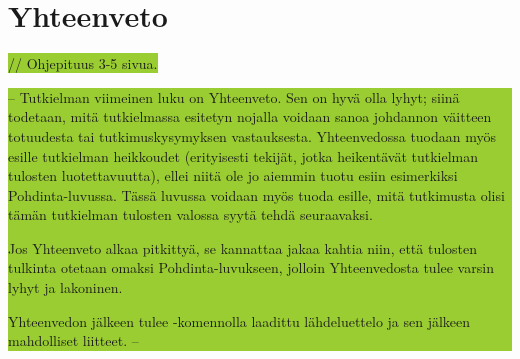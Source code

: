 \documentclass[utf8]{gradu3}
\begin{document}
\chapter{Yhteenveto}
\colorbox{YellowGreen}{// Ohjepituus 3-5 sivua.}

\colorbox{YellowGreen}{-- Tutkielman viimeinen luku on Yhteenveto.  Sen on hyvä olla lyhyt; siinä todetaan, mitä tutkielmassa esitetyn nojalla voidaan sanoa johdannon väitteen totuudesta tai tutkimuskysymyksen vastauksesta. Yhteenvedossa tuodaan myös esille tutkielman heikkoudet (erityisesti tekijät, jotka heikentävät tutkielman tulosten luotettavuutta), ellei niitä ole jo aiemmin tuotu esiin esimerkiksi Pohdinta-luvussa. Tässä luvussa voidaan myös tuoda esille, mitä tutkimusta olisi tämän tutkielman tulosten valossa syytä tehdä seuraavaksi.

Jos Yhteenveto alkaa pitkittyä, se kannattaa jakaa kahtia niin, että tulosten tulkinta otetaan omaksi Pohdinta-luvukseen, jolloin Yhteenvedosta tulee varsin lyhyt ja lakoninen.

Yhteenvedon jälkeen tulee \string\printbibliography-komennolla laadittu lähdeluettelo ja sen jälkeen mahdolliset liitteet. --}


\printbibliography

%

\appendix
\end{document}
